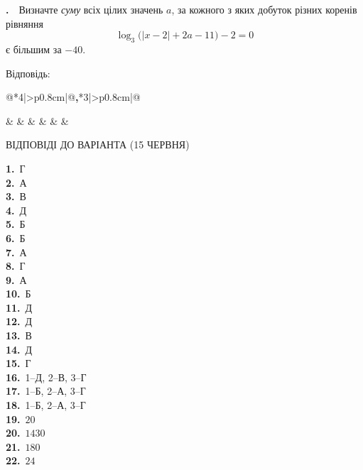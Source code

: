 \documentclass[12pt]{article}
\makeatletter
\newcommand{\sectionTitle}[1]{%
\par\vspace{0.4cm}
\begin{tcolorbox}[colback=titleBg, colframe=titleBg, boxrule=0pt, arc=8pt, halign=center, fontupper=\Large\bfseries\color{mainGreen}]
#1
\end{tcolorbox}\par\vspace{0.3cm}}
\newcommand{\nmtAnswerBox}{%
\par\vspace{0.2cm}\noindent
Відповідь:\ \ 
\begin{tabular}{@{}*{4}{|>{\centering\arraybackslash}p{0.8cm}}|@{\hspace{0.1cm}\textbf{,}\hspace{0.1cm}}*{3}{|>{\centering\arraybackslash}p{0.8cm}}|@{}}
\hline
\rule[-0.2cm]{0pt}{0.7cm} & & & & & & \\
\hline
\end{tabular}
\par\vspace{0.3cm}}
\newcounter{zad}
\newcommand{\zadtask}[1]{\stepcounter{zad}\par\vspace{0.3cm}\noindent\textbf{\thezad.}\ \ #1\par\vspace{0.2cm}}
\makeatother
\begin{document}
\zadtask{Визначте \textit{суму} всіх цілих значень $a$, за кожного з яких добуток різних коренів рівняння
\[
\log_3\!\big(|x - 2| + 2a - 11\big) - 2 = 0
\]
є більшим за $-40$.}
\nmtAnswerBox

\sectionTitle{ВІДПОВІДІ ДО ВАРІАНТА (15 ЧЕРВНЯ)}
\textbf{1.}\ Г\\
\textbf{2.}\ А\\
\textbf{3.}\ В\\
\textbf{4.}\ Д\\
\textbf{5.}\ Б\\
\textbf{6.}\ Б\\
\textbf{7.}\ А\\
\textbf{8.}\ Г\\
\textbf{9.}\ А\\
\textbf{10.}\ Б\\
\textbf{11.}\ Д\\
\textbf{12.}\ Д\\
\textbf{13.}\ В\\
\textbf{14.}\ Д\\
\textbf{15.}\ Г\\
\textbf{16.}\ 1--Д, 2--В, 3--Г\\
\textbf{17.}\ 1--Б, 2--А, 3--Г\\
\textbf{18.}\ 1--Б, 2--А, 3--Г\\
\textbf{19.}\ $20$\\
\textbf{20.}\ $1430$\\
\textbf{21.}\ $180$\\
\textbf{22.}\ $24$\\
\end{document}

